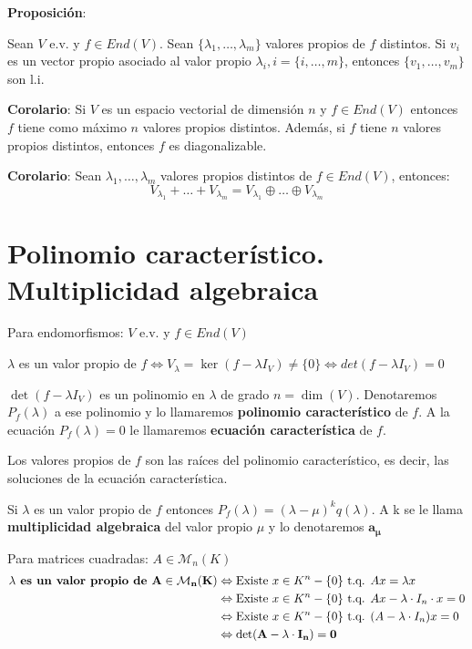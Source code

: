 \documentclass[x11names,table]{report}
\begin{document}
\textbf{Proposición}:

Sean $V$ e.v. y $f\in End(V)$. Sean $\{\lambda_1,\dots,\lambda_m\}$ valores propios de $f$ distintos. Si $v_i$ es un vector propio asociado al valor propio $\lambda_i, i=\{i,\dots, m\}$, entonces $\{v_1,\dots,v_m\}$ son l.i.

\textbf{Corolario}:
Si $V$ es un espacio vectorial de dimensión $n$ y $f\in End(V)$ entonces $f$ tiene como máximo $n$ valores propios distintos. Además, si $f$ tiene $n$ valores propios distintos, entonces $f$ es diagonalizable.

\textbf{Corolario}: 
Sean $\lambda_1,\dots,\lambda_m$ valores propios distintos de $f\in End(V)$, entonces:
\[V_{\lambda_1}+\dots+V_{\lambda_m}=V_{\lambda_1}\oplus\dots\oplus V_{\lambda_m}\]

\section{Polinomio característico. Multiplicidad algebraica}

Para endomorfismos: $V$ e.v. y $f\in End(V)$

$\lambda$ es un valor propio de $f \Leftrightarrow V_\lambda=\ker(f-\lambda I_V)\not=\{0\} \Leftrightarrow det(f-\lambda I_V)=0$

$\det(f-\lambda I_V)$ es un polinomio en $\lambda$ de grado $n=\dim(V)$.
Denotaremos $P_f(\lambda)$ a ese polinomio y lo llamaremos \textbf{polinomio característico} de $f$. A la ecuación $P_f(\lambda)=0$ le llamaremos \textbf{ecuación característica} de $f$.

Los valores propios de $f$ son las raíces del polinomio característico, es decir, las soluciones de la ecuación característica.

Si $\lambda$ es un valor propio de $f$ entonces $P_f(\lambda)=(\lambda-\mu)^k q(\lambda)$. A k se le llama \textbf{multiplicidad algebraica} del valor propio $\mu$ y lo denotaremos $\mathbf{a_\mu}$

Para matrices cuadradas: $A\in\mathcal{M}_n(K)$
\[
\begin{split}
\mathbf{\lambda} \text{\textbf{ es un valor propio de }}\mathbf{A\in\mathcal{M}_n(K)} &\Leftrightarrow \text{Existe } x\in K^n-\{0\} \text{ t.q. } Ax=\lambda x\\
&\Leftrightarrow\text{Existe } x\in K^n-\{0\} \text{ t.q. } Ax-\lambda\cdot I_n\cdot x=0\\
&\Leftrightarrow\text{Existe } x\in K^n-\{0\} \text{ t.q. }(A-\lambda\cdot I_n)x=0\\
&\Leftrightarrow\mathbf{\det(A-\lambda\cdot I_n)=0}\\
\end{split}
\]
\end{document}
